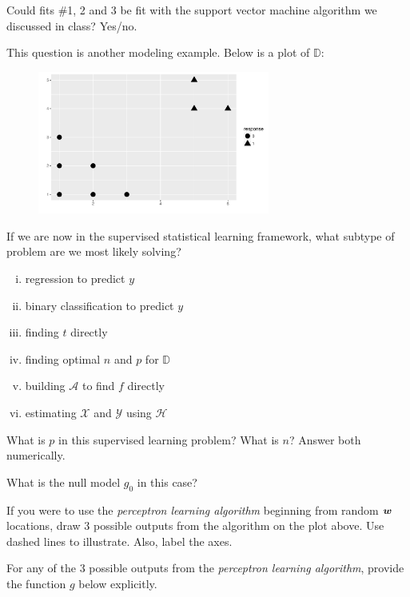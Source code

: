 \documentclass[12pt]{article}
\begin{document}
 Could fits \#1, 2 and 3 be fit with the support vector machine algorithm we discussed in class? Yes/no.

\eenum


\problem This question is another modeling example. Below is a plot of $\mathbb{D}$:

\begin{figure}[htp]
\centering
\includegraphics[width=3in]{linsep}
\end{figure}

\benum
{} If we are now in the supervised statistical learning framework, what subtype of problem are we most likely solving?

\begin{enumerate}[i)]
\item regression to predict $y$
\item binary classification to predict $y$
\item finding $t$ directly
\item finding optimal $n$ and $p$ for $\mathbb{D}$
\item building $\mathcal{A}$ to find $f$ directly
\item estimating $\mathcal{X}$ and $\mathcal{Y}$ using $\mathcal{H}$
\end{enumerate}

 What is $p$ in this supervised learning problem? What is $n$? Answer both numerically. 

 What is the null model $g_0$ in this case? 

 If you were to use the \emph{perceptron learning algorithm} beginning from random $\boldsymbol{w}$ locations, draw 3 possible outputs from the algorithm on the plot above. Use dashed lines to illustrate. Also, label the axes. 

 For any of the 3 possible outputs from the \emph{perceptron learning algorithm}, provide the function $g$ below explicitly.
\end{document}
